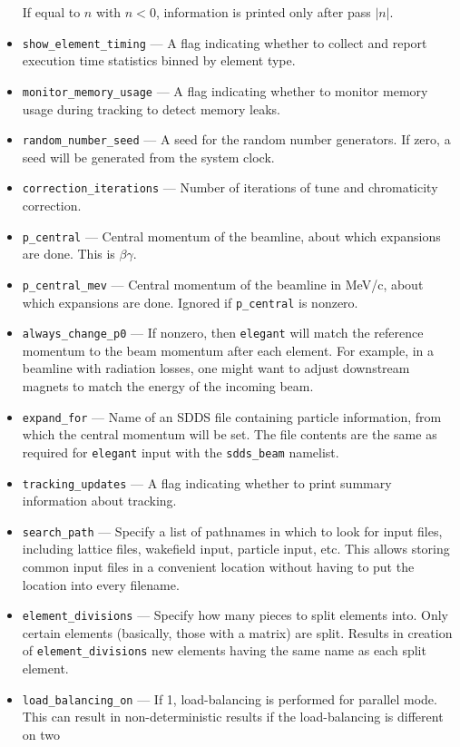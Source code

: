 \documentclass[11pt]{article}
\begin{document}
\begin{itemize}
If equal to $n$ with $n<0$, information is printed only after pass $\left|n\right|$.
\item \verb|show_element_timing| --- A flag indicating whether to collect and report execution time statistics binned by element type.
\item \verb|monitor_memory_usage| --- A flag indicating whether to monitor memory usage during tracking to detect memory leaks.
\item \verb|random_number_seed| --- A seed for the random number generators.  If zero, a seed will be generated from the system clock.
\item \verb|correction_iterations| --- Number of iterations of tune and chromaticity correction.
\item \verb|p_central| --- Central momentum of the beamline, about which expansions are done.
        This is $\beta\gamma$.
\item \verb|p_central_mev| --- Central momentum of the beamline in
MeV/c, about which expansions are done.  Ignored if \verb|p_central| is nonzero.
\item \verb|always_change_p0| --- If nonzero, then {\tt elegant} will match the reference momentum to
  the beam momentum after each element.  For example, in a beamline with radiation losses, one might
  want to adjust downstream magnets to match the energy of the incoming beam.
\item \verb|expand_for| --- Name of an SDDS file containing particle information, from which the central
momentum will be set.  The file contents are the same as required for {\tt elegant} input with the \verb|sdds_beam| namelist.
\item \verb|tracking_updates| --- A flag indicating whether to print summary information about
tracking.
\item \verb|search_path| --- Specify a list of pathnames in which to look for input files,
 including lattice files, wakefield input, particle input, etc.  This allows storing common
 input files in a convenient location without having to put the location into every filename.
\item \verb|element_divisions| --- Specify how many pieces to split elements into.  Only 
 certain elements (basically, those with a matrix) are split.  Results in creation of 
 \verb|element_divisions| new elements having the same name as each split element.
\item \verb|load_balancing_on| --- If 1, load-balancing is performed for parallel mode.
 This can result in non-deterministic results if the load-balancing is different on two

\end{itemize}
\end{document}

